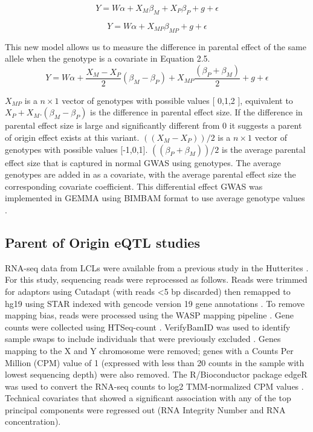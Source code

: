 \begin{equation}
Y =W\alpha + X_{M}\beta_{M}+ X_{P}\beta_{P}+g+\epsilon
\end{equation}

\begin{equation}
Y =W\alpha + X_{MP}\beta_{MP}+g+\epsilon
\end{equation}

This new model allows us to measure the difference in parental effect of the same allele when the genotype is a covariate in Equation 2.5. 
\begin{equation}
Y =W\alpha + \frac{X_{M}-X_{P}}{2}(\beta_{M}-\beta_{P}) + X_{MP}\frac{(\beta_{P}+\beta_{M})}{2} +g+\epsilon
\end{equation}

$X_{MP}$ is a $n \times 1$ vector of genotypes with possible values [ 0,1,2 ], equivalent to $X_P+ X_M. (\beta_M-\beta_P )$ is the difference in parental effect size. If the difference in parental effect size is large and significantly different from 0 it suggests a parent of origin effect exists at this variant. $((X_M-X_P ))/2$ is a $n \times 1$ vector of genotypes with possible values [-1,0,1].  $((\beta_P+\beta_M))/2$   is the average parental effect size that is captured in normal GWAS using genotypes. The average genotypes are added in as a covariate, with the average parental effect size the corresponding covariate coefficient. This differential effect GWAS was implemented in GEMMA using BIMBAM format to use average genotype values \cite{Servin:2007gj}.


\subsection{Parent of Origin eQTL studies}\label{Parent of Origin eQTL studies}

RNA-seq data from LCLs were available from a previous study in the Hutterites \cite{Cusanovich:2016id}. For this study, sequencing reads were reprocessed as follows. Reads were trimmed for adaptors using Cutadapt (with reads \textless5 bp discarded) then remapped to hg19 using STAR indexed with gencode version 19 gene annotations \cite{Dobin:2002by,Martin:2011eu}. To remove mapping bias, reads were processed using the WASP mapping pipeline \cite{vandeGeijn:2015hi}. Gene counts were collected using HTSeq-count \cite{Anders:2015gf}. VerifyBamID was used to identify sample swaps to include individuals that were previously excluded \cite{Jun:2012je}. Genes mapping to the X and Y chromosome were removed; genes with a Counts Per Million (CPM) value of 1 (expressed with less than 20 counts in the sample with lowest sequencing depth) were also removed. The R/Bioconductor package edgeR was used to convert the RNA-seq counts to log2 TMM-normalized CPM values \cite{Robinson:2010dd,Robinson:2010cw}. Technical covariates that showed a significant association with any of the top principal components were regressed out (RNA Integrity Number and RNA concentration).



